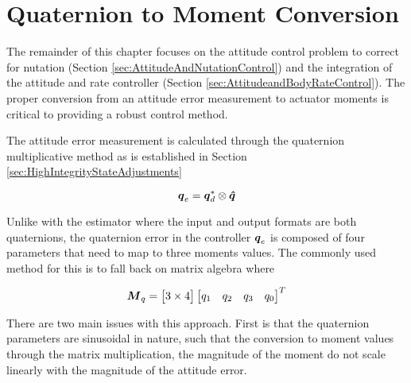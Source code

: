 \section{Quaternion to Moment Conversion}
\label{sec:QuaternionToMomentConversion}

The remainder of this chapter focuses on the attitude control problem to correct for nutation (Section \ref{sec:AttitudeAndNutationControl}) and the integration of the attitude and rate controller (Section \ref{sec:AttitudeandBodyRateControl}).  The proper conversion from an attitude error measurement to actuator moments is critical to providing a robust control method.

The attitude error measurement is calculated through the quaternion multiplicative method as is established in Section \ref{sec:HighIntegrityStateAdjustments}

\begin{equation}
  \boldsymbol{q}_e = \boldsymbol{q}_d^* \otimes \boldsymbol{\hat{q}}
\end{equation}

Unlike with the estimator where the input and output formats are both quaternions, the quaternion error in the controller $\boldsymbol{q}_e$ is composed of four parameters that need to map to three moments values.  The commonly used method for this is to fall back on matrix algebra where

\begin{equation}
  \boldsymbol{M}_q = \begin{bmatrix} 3 \times 4 \end{bmatrix} \begin{bmatrix} q_1 & q_2 & q_3 & q_0 \end{bmatrix}^T
  \label{eqn:traditional_attitude_controller}
\end{equation}

There are two main issues with this approach.  First is that the quaternion parameters are sinusoidal in nature, such that the conversion to moment values through the matrix multiplication, the magnitude of the moment do not scale linearly with the magnitude of the attitude error.

